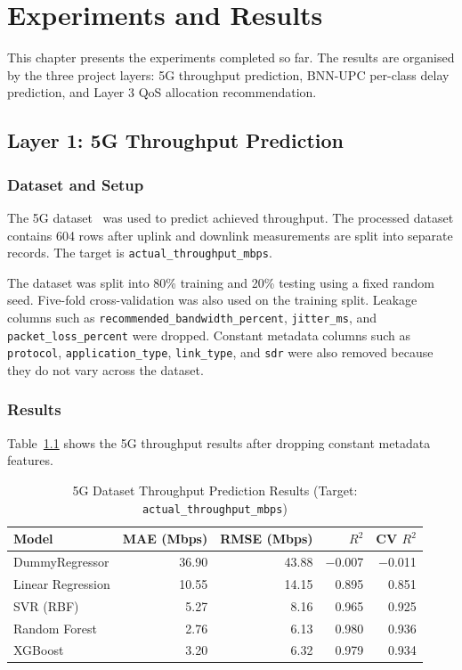 \documentclass[a4paper,12pt]{Classes/RoboticsLaTeX}
\begin{document}
\chapter{Experiments and Results}
\label{chap:results}

This chapter presents the experiments completed so far. The results are organised by the three project layers: 5G throughput prediction, BNN-UPC per-class delay prediction, and Layer 3 QoS allocation recommendation.

\section{Layer 1: 5G Throughput Prediction}

\subsection{Dataset and Setup}

The 5G dataset~\cite{raffeck2024zenodo} was used to predict achieved throughput. The processed dataset contains 604 rows after uplink and downlink measurements are split into separate records. The target is \texttt{actual\_throughput\_mbps}.

The dataset was split into 80\% training and 20\% testing using a fixed random seed. Five-fold cross-validation was also used on the training split. Leakage columns such as \texttt{recommended\_bandwidth\_percent}, \texttt{jitter\_ms}, and \texttt{packet\_loss\_percent} were dropped. Constant metadata columns such as \texttt{protocol}, \texttt{application\_type}, \texttt{link\_type}, and \texttt{sdr} were also removed because they do not vary across the dataset.

\subsection{Results}

Table~\ref{tab:zenodo_results} shows the 5G throughput results after dropping constant metadata features.

\begin{table}[H]
\centering
\caption[5G Throughput Prediction Results]{5G Dataset Throughput Prediction Results (Target: \texttt{actual\_throughput\_mbps})}
\label{tab:zenodo_results}
\begin{tabular}{|l|r|r|r|r|}
\hline
\textbf{Model} & \textbf{MAE (Mbps)} & \textbf{RMSE (Mbps)} & \textbf{$R^2$} & \textbf{CV $R^2$} \\
\hline
DummyRegressor & 36.90 & 43.88 & $-$0.007 & $-$0.011 \\
\hline
Linear Regression & 10.55 & 14.15 & 0.895 & 0.851 \\
\hline
SVR (RBF) & 5.27 & 8.16 & 0.965 & 0.925 \\
\hline
Random Forest & 2.76 & 6.13 & 0.980 & 0.936 \\
\hline
XGBoost & 3.20 & 6.32 & 0.979 & 0.934 \\
\hline
\end{tabular}
\end{table}
\end{document}
